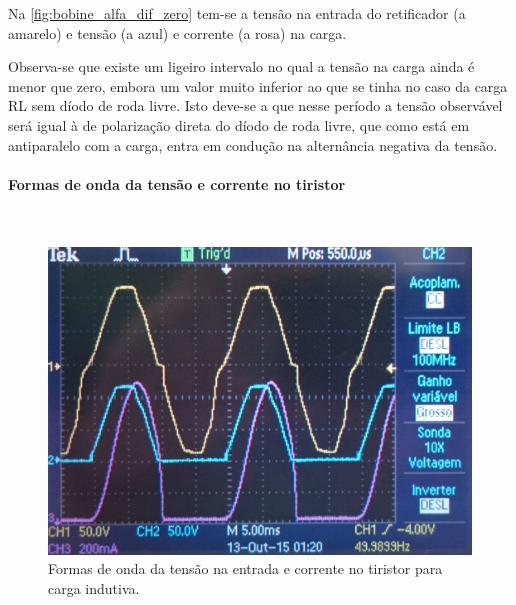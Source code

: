 \documentclass[a4paper,11pt]{article}
\numberwithin{equation}{section}
\begin{document}
Na \autoref{fig:bobine_alfa_dif_zero} tem-se a tensão na entrada do retificador (a amarelo) e tensão (a azul) e corrente (a rosa) na carga.

Observa-se que existe um ligeiro intervalo no qual a tensão na carga ainda é menor que zero, embora um valor muito inferior ao que se tinha no caso da carga RL sem díodo de roda livre. Isto deve-se a que nesse período a tensão observável será igual à de polarização direta do díodo de roda livre, que como está em antiparalelo com a carga, entra em condução na alternância negativa da tensão. 

\paragraph{Formas de onda da tensão e corrente no tiristor}\mbox{}\

\begin{figure}[H]
	\centering
	\includegraphics[keepaspectratio=true, scale=0.11]{img/figs/tiristor_alfa_zero}
	\caption{Formas de onda da tensão na entrada e corrente no tiristor para carga indutiva.}
	\label{fig:tiristor_alfa_zero}
	\vspace{-0.8em}
\end{figure}
\end{document}
